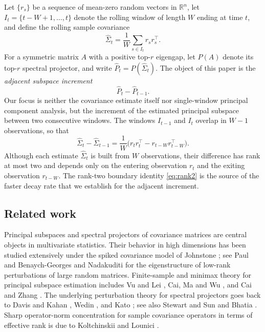 \documentclass[11pt]{article}
\theoremstyle{tightplain}
\theoremstyle{tightdef}
\newcommand{\R}{\mathbb R}
\begin{document}
Let $\{r_s\}$ be a sequence of mean-zero random vectors in $\R^n$, let
$I_t=\{t-W+1,\ldots,t\}$ denote the rolling window of length $W$ ending at time
$t$, and define the rolling sample covariance
\[
\widehat\Sigma_t=\frac1W\sum_{s\in I_t}r_s r_s^\top.
\]
For a symmetric matrix $A$ with a positive top-$r$ eigengap, let $P(A)$ denote
its top-$r$ spectral projector, and write $\widehat P_t=P(\widehat\Sigma_t)$.
The object of this paper is the \emph{adjacent subspace increment}
\[
\widehat P_t-\widehat P_{t-1}.
\]
Our focus is neither the covariance estimate itself nor single-window principal
component analysis, but the increment of the estimated principal subspace
between two consecutive windows. The windows $I_{t-1}$ and $I_t$ overlap in
$W-1$ observations, so that
\begin{equation}\label{eq:rank2}
\widehat\Sigma_t-\widehat\Sigma_{t-1}
=\frac1W\bigl(r_t r_t^\top-r_{t-W}r_{t-W}^\top\bigr).
\end{equation}
Although each estimate $\widehat\Sigma_t$ is built from $W$ observations, their
difference has rank at most two and depends only on the entering observation
$r_t$ and the exiting observation $r_{t-W}$. The rank-two boundary identity
\eqref{eq:rank2} is the source of the faster decay rate that we establish for
the adjacent increment.

\subsection{Related work}

Principal subspaces and spectral projectors of covariance matrices are central
objects in multivariate statistics. Their behavior in high dimensions has been
studied extensively under the spiked covariance model of Johnstone
\cite{Johnstone2001}; see Paul \cite{Paul2007} and Benaych-Georges and
Nadakuditi \cite{BenaychNadakuditi2011} for the eigenstructure of low-rank
perturbations of large random matrices. Finite-sample and minimax theory for
principal subspace estimation includes Vu and Lei \cite{VuLei2013}, Cai, Ma and
Wu \cite{CaiMaWu2013}, and Cai and Zhang \cite{CaiZhang2018}. The underlying
perturbation theory for spectral projectors goes back to Davis and Kahan
\cite{DavisKahan1970}, Wedin \cite{Wedin1972}, and Kato \cite{Kato1995}; see
also Stewart and Sun \cite{StewartSun1990} and Bhatia \cite{Bhatia1997}. Sharp
operator-norm concentration for sample covariance operators in terms of
effective rank is due to Koltchinskii and Lounici \cite{KoltchinskiiLounici2017}.
\end{document}
